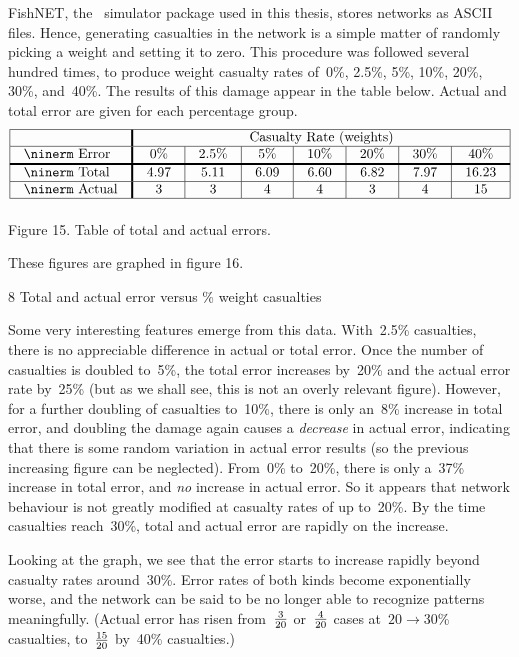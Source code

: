 FishNET, the \nn\ simulator package used in this thesis, stores
networks as ASCII files.
Hence, generating casualties in the network is a simple matter of
randomly picking a weight and setting it to zero.
This procedure was followed several hundred times, to produce
weight casualty rates of~0\%, 2.5\%, 5\%, 10\%, 20\%, 30\%, and~40\%.
The results of this damage appear in the table below.
Actual and total error are given for each percentage group.
$$
\vbox{\tabskip=0pt \offinterlineskip
\def\tablerule{\noalign{\hrule}}
\halign{\strut#& \vrule#\tabskip=1em plus2em&
 #\hfil& \vrule width1.5pt#&
 \hfil#\hfil& \vrule#&
 \hfil#\hfil& \vrule#&
 \hfil#\hfil& \vrule#&
 \hfil#\hfil& \vrule#&
 \hfil#\hfil& \vrule#&
 \hfil#\hfil& \vrule#&
 \hfil#\hfil& \vrule#\tabskip=0pt\cr
\tablerule
&&&&\multispan{13}\hfil Casualty Rate (weights)\hfil&\cr
\tablerule
&&{\ninerm Error}&&0\%&&2.5\%&&5\%&&10\%&&20\%&&30\%&&40\%&\cr
\noalign{\hrule height1.5pt}
&&{\ninerm Total}&&4.97&&5.11&&6.09&&6.60&&6.82&&7.97&&16.23&\cr
\tablerule
&&{\ninerm Actual}&&3&&3&&4&&4&&3&&4&&15&\cr
\tablerule
}}
$$
\centerline{Figure 15. Table of total and actual errors.}

These figures are graphed in figure 16.

 {8} {Total and actual error versus \% weight casualties}

Some very interesting features emerge from this data.
With~2.5\% casualties, there is no appreciable difference in actual
or total error.
Once the number of casualties is doubled to~5\%, the total error
increases by~20\% and the actual error rate by~25\% (but as we shall see,
this is not an overly relevant figure).
However, for a further doubling of casualties to~10\%, there is only
an~8\% increase in total error, and doubling the damage
again causes a {\sl decrease\/} in actual error,
indicating that there is some random variation in actual error
results (so the previous increasing figure can be neglected).
From~0\% to~20\%, there is only a~37\% increase in total error,
and {\sl no\/} increase in actual error.
So it appears that network behaviour is not greatly modified at
casualty rates of up to~20\%.
By the time casualties reach~30\%, total and actual error are rapidly
on the increase.

Looking at the graph, we see that the error starts to increase
rapidly beyond casualty rates around~30\%.
Error rates of both kinds become exponentially worse, and the
network can be said to be no longer able to recognize patterns
meaningfully.
(Actual error has risen from~$3\over20$ or~$4\over20$ cases
at~$20\to30$\% casualties, to~$15\over20$ by~40\% casualties.)

